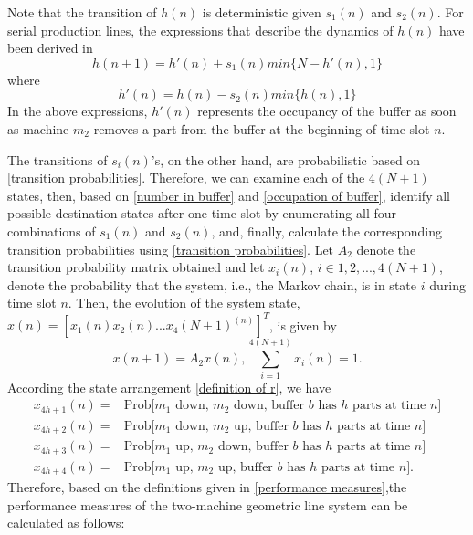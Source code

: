 Note that the transition of $h(n)$ is deterministic given $s_1(n)$ and $s_2(n)$. For serial production lines, the expressions that describe the dynamics of $h(n)$ have been derived in \cite{zhang2013transient}
\begin{equation}
	h(n+1)=h'(n) + s_1(n)min\{N-h'(n),1\}
	\label{number in buffer}
\end{equation}
where
\begin{equation}
	h'(n)=h(n)-s_2(n)min\{h(n),1\}
\label{occupation of buffer}
\end{equation}
In the above expressions, $h'(n)$ represents the occupancy of the buffer as soon as machine $m_2$ removes a part from the buffer at the beginning of time slot $n$.

The transitions of $s_i(n)$'s, on the other hand, are probabilistic based on \ref{transition probabilities}. Therefore, we can examine each of the $4(N+1)$ states, then, based on \ref{number in buffer} and \ref{occupation of buffer}, identify all possible destination states after one time slot by enumerating all four combinations of $s_1(n)$ and $s_2(n)$, and, finally, calculate the corresponding transition probabilities using \ref{transition probabilities}. Let $A_2$ denote the transition probability matrix obtained and let $x_i(n)$, $i\in {1,2,...,4(N+1)}$, denote the probability that the system, i.e., the Markov chain, is in state $i$ during time slot $n$. Then, the evolution of the system state, $x(n)=[x_1(n)x_2(n)...x_4(N+1)^{(n)}]^T$, is given by
\begin{equation}
	x(n+1) = A_2x(n), \sum_{i=1}^{4(N+1)} x_i(n) = 1 .
\end{equation}
According the state arrangement \ref{definition of r}, we have
\begin{equation}
	\begin{aligned}
		x_{4h+1}(n)=&\text{Prob[$m_1$ down, $m_2$ down, buffer $b$ has $h$ parts at time $n$]}  \\
		x_{4h+2}(n)=&\text{Prob[$m_1$ down, $m_2$ up, buffer $b$ has $h$ parts at time $n$]}  \\
		x_{4h+3}(n)=&\text{Prob[$m_1$ up, $m_2$ down, buffer $b$ has $h$ parts at time $n$]} \\
		x_{4h+4}(n)=&\text{Prob[$m_1$ up, $m_2$ up, buffer $b$ has $h$ parts at time $n$]}.
	\end{aligned}
\end{equation}
Therefore, based on the definitions given in \ref{performance measures},the performance measures of the two-machine geometric line system can be calculated as follows:
